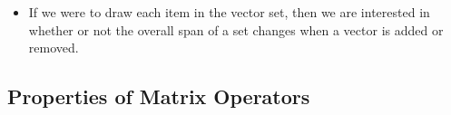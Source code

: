 \begin{itemize}
    \item If we were to draw each item in the vector set, then we are interested in whether or not the overall span of a set changes when a vector is added or removed. 
\end{itemize}

\subsection{Properties of Matrix Operators}

